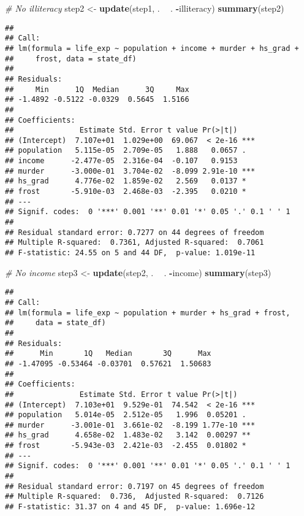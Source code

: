 \documentclass[]{article}
\newenvironment{Shaded}{\begin{snugshade}}{\end{snugshade}}
\newcommand{\CommentTok}[1]{\textcolor[rgb]{0.56,0.35,0.01}{\textit{#1}}}
\newcommand{\KeywordTok}[1]{\textcolor[rgb]{0.13,0.29,0.53}{\textbf{#1}}}
\newcommand{\NormalTok}[1]{#1}
\newcommand{\OperatorTok}[1]{\textcolor[rgb]{0.81,0.36,0.00}{\textbf{#1}}}
\newcommand{\StringTok}[1]{\textcolor[rgb]{0.31,0.60,0.02}{#1}}
\begin{document}
\begin{Shaded}
\begin{Highlighting}[]
\CommentTok{# No illiteracy}
\NormalTok{step2 <-}\StringTok{ }\KeywordTok{update}\NormalTok{(step1, . }\OperatorTok{~}\StringTok{ }\NormalTok{. }\OperatorTok{-}\NormalTok{illiteracy)}
\KeywordTok{summary}\NormalTok{(step2)}
\end{Highlighting}
\end{Shaded}

\begin{verbatim}
## 
## Call:
## lm(formula = life_exp ~ population + income + murder + hs_grad + 
##     frost, data = state_df)
## 
## Residuals:
##     Min      1Q  Median      3Q     Max 
## -1.4892 -0.5122 -0.0329  0.5645  1.5166 
## 
## Coefficients:
##               Estimate Std. Error t value Pr(>|t|)    
## (Intercept)  7.107e+01  1.029e+00  69.067  < 2e-16 ***
## population   5.115e-05  2.709e-05   1.888   0.0657 .  
## income      -2.477e-05  2.316e-04  -0.107   0.9153    
## murder      -3.000e-01  3.704e-02  -8.099 2.91e-10 ***
## hs_grad      4.776e-02  1.859e-02   2.569   0.0137 *  
## frost       -5.910e-03  2.468e-03  -2.395   0.0210 *  
## ---
## Signif. codes:  0 '***' 0.001 '**' 0.01 '*' 0.05 '.' 0.1 ' ' 1
## 
## Residual standard error: 0.7277 on 44 degrees of freedom
## Multiple R-squared:  0.7361, Adjusted R-squared:  0.7061 
## F-statistic: 24.55 on 5 and 44 DF,  p-value: 1.019e-11
\end{verbatim}

\begin{Shaded}
\begin{Highlighting}[]
\CommentTok{# No income}
\NormalTok{step3 <-}\StringTok{ }\KeywordTok{update}\NormalTok{(step2, . }\OperatorTok{~}\StringTok{ }\NormalTok{. }\OperatorTok{-}\NormalTok{income)}
\KeywordTok{summary}\NormalTok{(step3)}
\end{Highlighting}
\end{Shaded}

\begin{verbatim}
## 
## Call:
## lm(formula = life_exp ~ population + murder + hs_grad + frost, 
##     data = state_df)
## 
## Residuals:
##      Min       1Q   Median       3Q      Max 
## -1.47095 -0.53464 -0.03701  0.57621  1.50683 
## 
## Coefficients:
##               Estimate Std. Error t value Pr(>|t|)    
## (Intercept)  7.103e+01  9.529e-01  74.542  < 2e-16 ***
## population   5.014e-05  2.512e-05   1.996  0.05201 .  
## murder      -3.001e-01  3.661e-02  -8.199 1.77e-10 ***
## hs_grad      4.658e-02  1.483e-02   3.142  0.00297 ** 
## frost       -5.943e-03  2.421e-03  -2.455  0.01802 *  
## ---
## Signif. codes:  0 '***' 0.001 '**' 0.01 '*' 0.05 '.' 0.1 ' ' 1
## 
## Residual standard error: 0.7197 on 45 degrees of freedom
## Multiple R-squared:  0.736,  Adjusted R-squared:  0.7126 
## F-statistic: 31.37 on 4 and 45 DF,  p-value: 1.696e-12
\end{verbatim}
\end{document}
